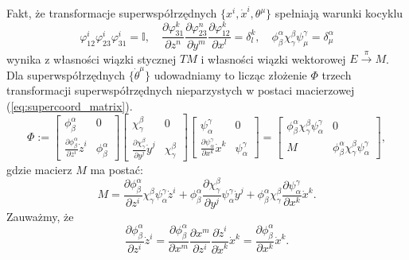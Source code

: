 \documentclass[11pt,a4paper]{report}
\theoremstyle{definition}
\newcommand{\I}{\mathbb{I}}
\begin{document}
Fakt, że transformacje superwspółrzędnych $\{ x^i, \dot{x}^i, \theta^\mu \}$ spełniają warunki kocyklu
\begin{equation*}
	\varphi_{12}^i \varphi_{23}^i \varphi_{31}^i = \I, \quad \frac{\partial \varphi^k_{31}}{\partial z^n} \frac{\partial \varphi^n_{23}}{\partial y^m} \frac{\partial \varphi^k_{12}}{\partial x^l} = \delta^k _l, \quad \phi ^\alpha _\beta \chi ^\beta _\gamma \psi ^\gamma _\mu = \delta ^\alpha _\mu
\end{equation*}
wynika z własności wiązki stycznej $TM$ i własności wiązki wektorowej $E \stackrel{\pi}{\rightarrow} M$. 
Dla superwspółrzędnych $\{ \dot{\theta}^\mu \}$ udowadniamy to licząc złożenie $\Phi$ trzech transformacji superwspółrzędnych nieparzystych w postaci macierzowej (\ref{eq:supercoord_matrix}).
\begin{equation}
	\label{eq:supercoord_matrix}
	\Phi :=
	\left[ \begin{array}{cc}
		\phi ^\alpha _\beta & 0 \\
	\frac{\partial \phi ^\alpha _\beta}{\partial z^i}\dot z^i & \phi ^\alpha _\beta \end{array} \right]
	\left[ \begin{array}{cc}
		\chi ^\beta _\gamma & 0 \\
	\frac{\partial \chi ^\beta _\gamma}{\partial y^j}\dot y^j & \chi ^\beta _\gamma \end{array} \right]
	\left[ \begin{array}{cc}
		\psi ^\gamma _\alpha & 0 \\
	\frac{\partial \psi ^\gamma _\alpha}{\partial x^k}\dot x^k & \psi ^\gamma _\alpha \end{array} \right]
	=
	\left[ \begin{array}{cc}
		\phi ^\alpha _\beta \chi ^\beta _\gamma \psi ^\gamma _\alpha & 0 \\
		M & \phi ^\alpha _\beta \chi ^\beta _\gamma \psi ^\gamma _\alpha
	\end{array} \right]\!,
\end{equation}
gdzie macierz $M$ ma postać:
\begin{equation*}
	M = \frac{\partial \phi ^\alpha _\beta}{\partial z^i} \chi ^\beta _\gamma \psi ^\gamma _\alpha \dot z^i + \phi ^\alpha _\beta \frac{\partial \chi ^\beta _\gamma}{\partial y^j} \psi ^\gamma _\alpha \dot y^j + \phi ^\alpha _\beta \chi ^\beta _\gamma \frac{\partial \psi ^\gamma _\alpha}{\partial x^k}\dot x^k.
\end{equation*}
Zauważmy, że 
$$\frac{\partial \phi ^\alpha _\beta}{\partial z^i}\dot z^i = \frac{\partial \phi ^\alpha _\beta}{\partial x^m} \frac{\partial x^m}{\partial z^i} \frac{\partial \dot z^i}{\partial \dot x^k} \dot x^k = \frac{\partial \phi ^\alpha _\beta}{\partial x^k} \dot x^k.$$
\end{document}

